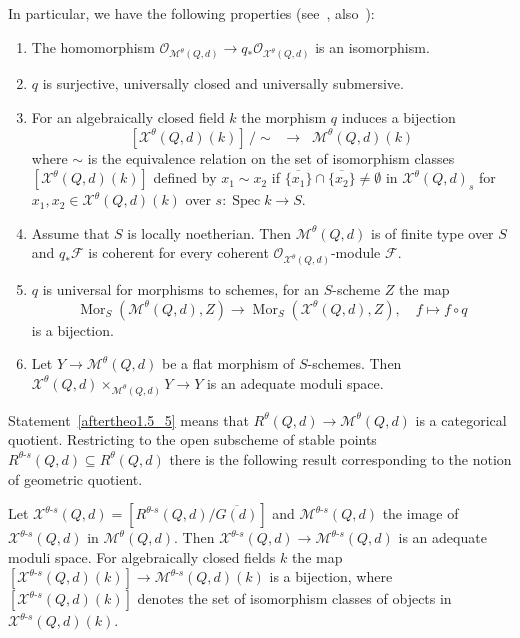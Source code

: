\documentclass[ALCO,ThmDefs,Unicode,epreuves]{cedram}
\def\O{\mathcal O}
\DeclareMathOperator{\Mor}{Mor}
\DeclareMathOperator{\Spec}{Spec}
\begin{document}
In particular, we have the following properties (see~\cite{Al14}, \cf also~\cite{Ses77}):
\begin{enumerate}[label=(\arabic*)]
\item\label{aftertheo1.5_1} The homomorphism $\O_{\mathcal M^\theta(Q,d)}\to q_*\O_{\mathcal X^\theta(Q,d)}$
is an isomorphism.
\item\label{aftertheo1.5_2} $q$ is surjective, universally closed and universally submersive.
\item\label{aftertheo1.5_3} For an algebraically closed field $k$ the morphism $q$ induces a bijection
\[
[\mathcal X^\theta(Q,d)(k)]\,/\!\sim\;\;\to\;\;\mathcal M^\theta(Q,d)(k)
\]
where $\sim$ is the equivalence relation on the set of isomorphism classes
$[\mathcal X^\theta(Q,d)(k)]$ defined by $x_1\sim x_2$ if 
$\overline{\{x_1\}}\cap\overline{\{x_2\}}\neq\emptyset$ 
in $\mathcal X^\theta(Q,d)_s$ for $x_1,x_2\in\mathcal X^\theta(Q,d)(k)$ 
over $s\colon\Spec k\to S$.
\item\label{aftertheo1.5_4} Assume that $S$ is locally noetherian. Then $\mathcal M^\theta(Q,d)$ is of 
finite type over $S$ and $q_*\mathscr F$ is coherent for every coherent 
$\O_{\mathcal X^\theta(Q,d)}$-module $\mathscr F$.
\item\label{aftertheo1.5_5} $q$ is universal for morphisms to schemes, \ie for an $S$-scheme $Z$ 
the map
\[
\Mor_S(\mathcal M^\theta(Q,d),Z)\to\Mor_S(\mathcal X^\theta(Q,d),Z),
\quad f\mapsto f\circ q
\]
is a bijection.
\item\label{aftertheo1.5_6} Let $Y\to\mathcal M^\theta(Q,d)$ be a flat morphism of $S$-schemes.
Then $\mathcal X^\theta(Q,d)\times_{\mathcal M^\theta(Q,d)}Y\to Y$
is an adequate moduli space.
\end{enumerate}

Statement~\ref{aftertheo1.5_5} means that $R^\theta(Q,d)\to\mathcal M^\theta(Q,d)$ is a 
categorical quotient. Restricting to the open subscheme of stable points 
$R^{\theta\text{-}s}(Q,d)\subseteq R^\theta(Q,d)$ there is the following 
result corresponding to the notion of geometric quotient.

\begin{coro} 
Let $\mathcal X^{\theta\text{-}s}(Q,d)\!=\![R^{\theta\text{-}s}(Q,d)/\overline{G(d)}]$
and $\mathcal M^{\theta\text{-}s}(Q,d)$ the image of
$\mathcal X^{\theta\text{-}s}(Q,d)$ in $\mathcal M^\theta(Q,d)$. 
Then $\mathcal X^{\theta\text{-}s}(Q,d)\to\mathcal M^{\theta\text{-}s}(Q,d)$
is an adequate moduli space. For algebraically closed fields $k$ the map 
$[\mathcal X^{\theta\text{-}s}(Q,d)(k)]\to\mathcal M^{\theta\text{-}s}(Q,d)(k)$ 
is a bijection, where $[\mathcal X^{\theta\text{-}s}(Q,d)(k)]$ denotes the set of 
isomorphism classes of objects in $\mathcal X^{\theta\text{-}s}(Q,d)(k)$. 
\end{coro}
\end{document}
